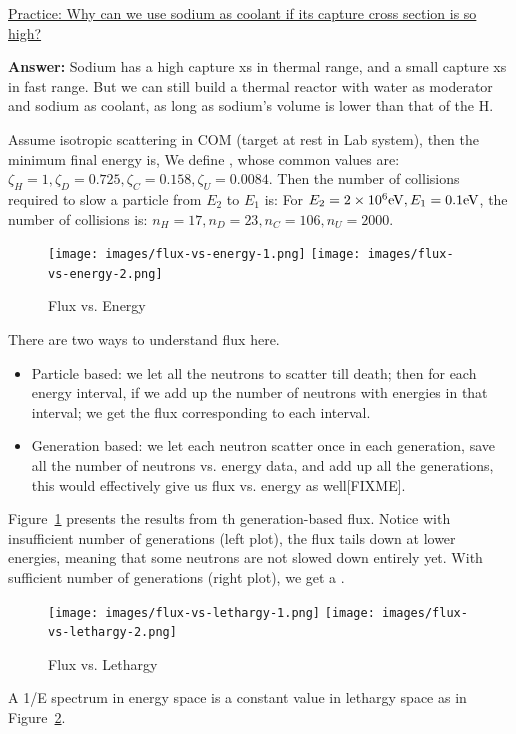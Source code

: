 \documentclass{school-22.211-notes}
\begin{document}
\uline{Practice: Why can we use sodium as coolant if its capture cross section is so high?}  

\textbf{Answer:} Sodium has a high capture xs in thermal range, and a small capture xs in fast range. But we can still build a thermal reactor with water as moderator and sodium as coolant, as long as sodium's volume is lower than that of the H. 


Assume isotropic scattering in COM (target at rest in Lab system), then the minimum final energy is,
We define ,
whose common values are: $\zeta_{H} = 1, \zeta_D = 0.725, \zeta_C = 0.158, \zeta_U = 0.0084$. Then the number of collisions required to slow a particle from $E_2$ to $E_1$ is: 
For $E_2 = 2\times 10^6 \mathrm{eV}, E_1 = 0.1 \mathrm{eV}$, the number of collisions is: $n_H = 17, n_D = 23, n_C = 106, n_U = 2000$. 

\begin{figure}
  \centering
  \texttt{[image: images/flux-vs-energy-1.png]}
  \texttt{[image: images/flux-vs-energy-2.png]}
  \caption{Flux vs. Energy} \label{fve}
\end{figure}
There are two ways to understand flux here. 
\begin{itemize}
\item Particle based: we let all the neutrons to scatter till death; then for each energy interval, if we add up the number of neutrons with energies in that interval; we get the flux corresponding to each interval.  
\item Generation based: we let each neutron scatter once in each generation, save all the number of neutrons vs. energy data, and add up all the generations, this would effectively give us flux vs. energy as well[FIXME]. 
\end{itemize}
Figure~\ref{fve} presents the results from th generation-based flux. Notice with insufficient number of generations (left plot), the flux tails down at lower energies, meaning that some neutrons are not slowed down entirely yet. With sufficient number of generations (right plot), we get a . 

\begin{figure}
  \centering
  \texttt{[image: images/flux-vs-lethargy-1.png]}
  \texttt{[image: images/flux-vs-lethargy-2.png]}
  \caption{Flux vs. Lethargy} \label{fvl}
\end{figure}
A 1/E spectrum in energy space is a constant value in lethargy space as in Figure~\ref{fvl}. 
\end{document}
